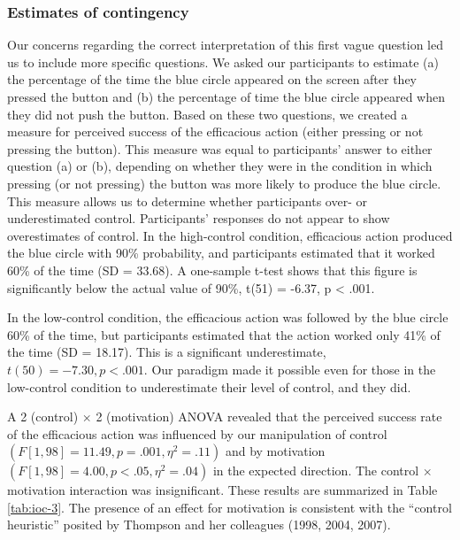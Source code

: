 \documentclass[USenglish,letterpaper,12pt,extrafontsizes,oneside,onecolumn,final]{memoir}
\begin{document}
\subsubsection{Estimates of contingency}
Our concerns regarding the correct interpretation of this first vague question led us to include more specific questions. We asked our participants to estimate (a) the percentage of the time the blue circle appeared on the screen after they pressed the button and (b) the percentage of time the blue circle appeared when they did not push the button. Based on these two questions, we created a measure for perceived success of the efficacious action (either pressing or not pressing the button). This measure was equal to participants' answer to either question (a) or (b), depending on whether they were in the condition in which pressing (or not pressing) the button was more likely to produce the blue circle. This measure allows us to determine whether participants over- or underestimated control. Participants' responses do not appear to show overestimates of control. In the high-control condition, efficacious action produced the blue circle with 90\% probability, and participants estimated that it worked 60\% of the time (SD = 33.68). 
A one-sample t-test shows that this figure is significantly below the actual value of 90\%, t(51) = -6.37, p < .001. 

In the low-control condition, the efficacious action was followed by the blue circle 60\% of the time, but participants estimated that the action worked only 41\% of the time (SD = 18.17). This is a significant underestimate, $t(50) = -7.30, p < .001$. Our paradigm made it possible even for those in the low-control condition to underestimate their level of control, and they did.

A 2 (control) $\times$ 2 (motivation) ANOVA revealed that the perceived success rate of the efficacious action was influenced by our manipulation of control $( F[1, 98] = 11.49, p = .001, \eta^2 = .11)$ and by motivation $( F[1, 98] = 4.00, p < .05, \eta^2 = .04)$ in the expected direction. The control $\times$ motivation interaction was insignificant. These results are summarized in Table \ref{tab:ioc-3}. The presence of an effect for motivation is consistent with the ``control heuristic'' posited by Thompson and her colleagues (1998, 2004, 2007).  
\end{document}
